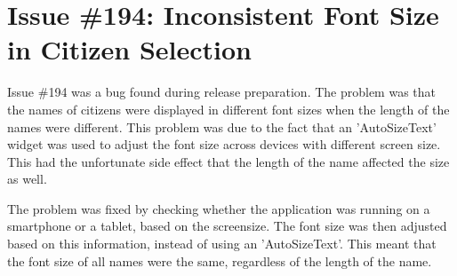 \section{Issue \#194: Inconsistent Font Size in Citizen Selection}
Issue \#194 was a bug found during release preparation. The problem was that the names of citizens were displayed in different font sizes when the length of the names were different. 
This problem was due to the fact that an 'AutoSizeText' widget was used to adjust the font size across devices with different screen size. This had the unfortunate side effect that the length of the name affected the size as well. 

The problem was fixed by checking whether the application was running on a smartphone or a tablet, based on the screensize. The font size was then adjusted based on this information, instead of using an 'AutoSizeText'.
This meant that the font size of all names were the same, regardless of the length of the name. 